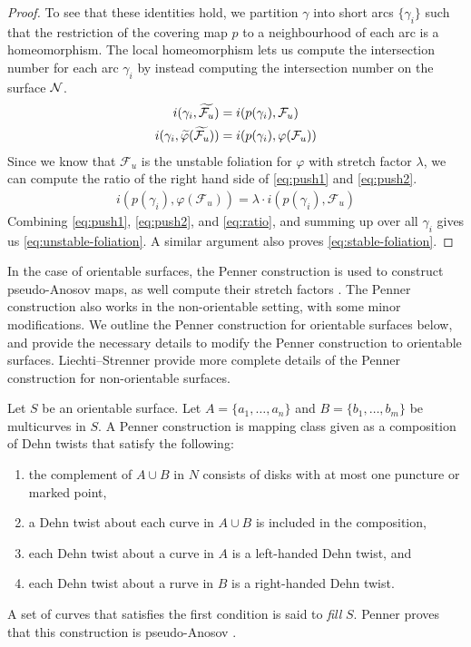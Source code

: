 \begin{proof}
  To see that these identities hold, we partition $\gamma$ into short arcs $\{\gamma_i\}$ such that the restriction of the covering map $p$ to a neighbourhood of each arc is a homeomorphism.
  The local homeomorphism lets us compute the intersection number for each arc $\gamma_i$ by instead computing the intersection number on the surface $\mathcal{N}$.
  \begin{align}
  \label{eq:push1}
    i(\gamma_i, \widetilde{\mathcal{F}_u}) &= i(p(\gamma_i), \mathcal{F}_u) \\
  \label{eq:push2}
    i(\gamma_i, \widetilde{\varphi}(\widetilde{\mathcal{F}_u})) &= i(p(\gamma_i), \varphi(\mathcal{F}_u))
  \end{align}
  Since we know that $\mathcal{F}_u$ is the unstable foliation for $\varphi$ with stretch factor $\lambda$, we can compute the ratio of the right hand side of \eqref{eq:push1} and \eqref{eq:push2}.
  \begin{align}
      \label{eq:ratio}
      i(p(\gamma_i), \varphi(\mathcal{F}_u)) = \lambda \cdot i(p(\gamma_i), \mathcal{F}_u)
  \end{align}
  Combining \eqref{eq:push1}, \eqref{eq:push2}, and \eqref{eq:ratio}, and summing up over all $\gamma_i$ gives us \eqref{eq:unstable-foliation}. A similar argument also proves \eqref{eq:stable-foliation}.
\end{proof}

In the case of orientable surfaces, the Penner construction is used to construct pseudo-Anosov maps, as well compute their stretch factors \cite{penner1988construction}. The Penner construction also works in the non-orientable setting, with some minor modifications. We outline the Penner construction for orientable surfaces below, and provide the necessary details to modify the Penner construction to orientable surfaces.  Liechti--Strenner \cite[Section 2]{LS} provide more complete details of the Penner construction for non-orientable surfaces.

 Let $S$ be an orientable surface.  Let $A = \{a_1,\dots,a_n\}$
and $B = \{b_1,\dots,b_m\}$ be multicurves in $S$.  A Penner construction is mapping class given as a composition of Dehn twists that satisfy the following:
\begin{enumerate}
\item the complement of $A\cup B$ in $N$ consists of disks with at most one puncture or marked point,
    \item a Dehn twist about each curve in $A\cup B$ is included in the composition,
    \item each Dehn twist about a curve in $A$ is a left-handed Dehn twist, and 
    \item each Dehn twist about a rurve in $B$ is a right-handed Dehn twist.
\end{enumerate}
  A set of curves that satisfies the first condition is said to {\it fill} $S$.  Penner proves that this construction is pseudo-Anosov \cite{penner1988construction}. 
  
